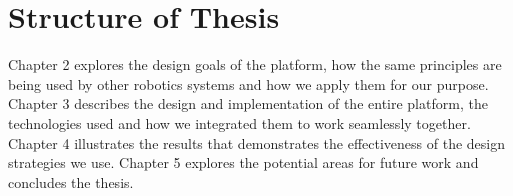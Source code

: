 \section{Structure of Thesis}
Chapter 2 explores the design goals of the \xten platform, how the same principles are being used by other robotics systems and how we apply them for our purpose. 
Chapter 3 describes the design and implementation of the entire platform, the technologies used and how we integrated them to work seamlessly together.
Chapter 4 illustrates the results that demonstrates the effectiveness of the design strategies we use.
Chapter 5 explores the potential areas for future work and concludes the thesis.

